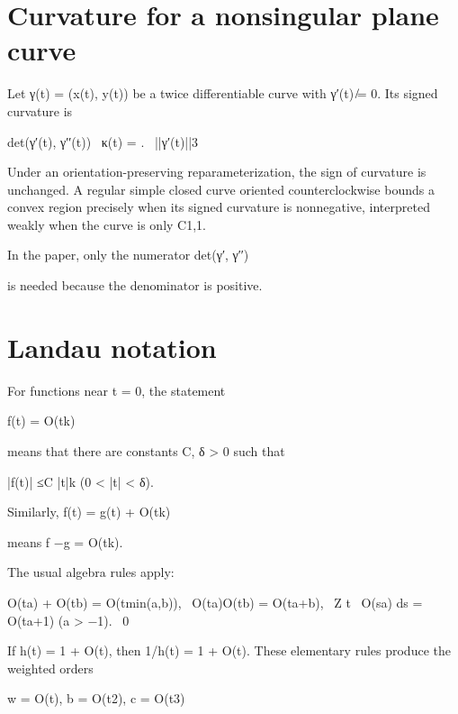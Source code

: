 \section{Curvature for a nonsingular plane curve}

\begin{displaytext}
Let γ(t) = (x(t), y(t)) be a twice differentiable curve with γ′(t) ̸= 0. Its signed curvature is
\end{displaytext}

\begin{displaytext}
det(γ′(t), γ′′(t)) \
κ(t) = . \
||γ′(t)||3
\end{displaytext}

Under an orientation-preserving reparameterization, the sign of curvature is unchanged. A regular simple closed curve oriented counterclockwise bounds a convex region precisely when its signed curvature is nonnegative, interpreted weakly when the curve is only C1,1.


In the paper, only the numerator det(γ′, γ′′)


is needed because the denominator is positive.


\section{Landau notation}

For functions near t = 0, the statement


f(t) = O(tk)


means that there are constants C, δ > 0 such that


\begin{displaytext}
|f(t)| ≤C |t|k (0 < |t| < δ).
\end{displaytext}

Similarly, f(t) = g(t) + O(tk)


means f −g = O(tk).


The usual algebra rules apply:


\begin{displaytext}
O(ta) + O(tb) = O(tmin(a,b)), \
O(ta)O(tb) = O(ta+b), \
Z t \
O(sa) ds = O(ta+1) (a > −1). \
0
\end{displaytext}

\begin{displaytext}
If h(t) = 1 + O(t), then 1/h(t) = 1 + O(t). These elementary rules produce the weighted orders
\end{displaytext}

\begin{displaytext}
w = O(t), b = O(t2), c = O(t3)
\end{displaytext}

